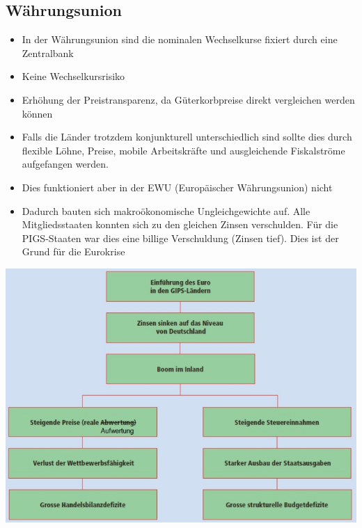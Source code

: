 \subsection{Währungsunion}
\begin{itemize}
	\item In der Währungsunion sind die nominalen Wechselkurse fixiert durch eine Zentralbank
	\item Keine Wechselkursrisiko
	\item Erhöhung der Preistransparenz, da Güterkorbpreise direkt vergleichen werden können
	\item Falls die Länder trotzdem konjunkturell unterschiedlich sind sollte dies durch flexible Löhne, Preise, mobile Arbeitskräfte und ausgleichende Fiskalströme aufgefangen werden. 
	\item Dies funktioniert aber in der EWU (Europäischer Währungsunion) nicht
	\item Dadurch bauten sich makroökonomische Ungleichgewichte auf. Alle Mitgliedsstaaten konnten sich zu den gleichen Zinsen verschulden. Für die PIGS-Staaten war dies eine billige Verschuldung (Zinsen tief). Dies ist der Grund für die Eurokrise
\end{itemize}
\includegraphics[width=0.8\linewidth]{images/eurokrise.jpg}